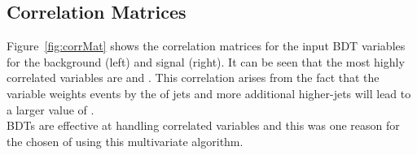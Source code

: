 

\subsection{Correlation Matrices}


Figure~\ref{fig:corrMat} shows the correlation matrices for the input BDT variables for the background \ttbar (left) and signal \tttt (right). It can be seen that the most highly correlated variables are \njetsw and \redhadmass. This correlation arises from the fact that the \njetsw variable weights events by the \pt of jets and more additional higher-\pt jets will lead to a larger value of \redhadmass.\\
BDTs are effective at handling correlated variables and this was one reason for the chosen of using this multivariate algorithm.

